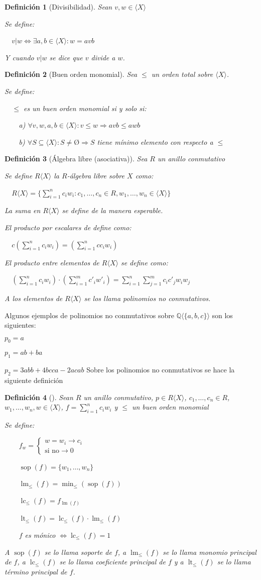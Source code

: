 \documentclass{amsbook}
\theoremstyle{customstyle}
\newtheorem{definition}{Definición}[section]
\newcommand{\definición}[2][]{
  \begin{definition}[#1]
  \setlength{\parindent}{2em} %
  #2
  \end{definition}
}
\DeclareMathOperator{\sop}{sop}
\DeclareMathOperator{\lm}{lm}
\DeclareMathOperator{\lc}{lc}
\DeclareMathOperator{\lt}{lt}
\begin{document}
\definición[Divisibilidad] {
Sean $v, w ∈ ⟨X⟩$

Se define:

  $v | w ⇔ ∃a , b ∈ ⟨X⟩ : w = avb$

Y cuando $v | w$ se dice que $v$ divide a $w$.
}

\definición[Buen orden monomial] {
Sea $≤$ un orden total sobre $⟨X⟩$.

Se define:

  $≤$ es un buen orden monomial si y solo si:

    a) $∀v, w, a, b ∈ ⟨X⟩ : v ≤ w ⇒ avb ≤ awb$

    b) $∀S ⊆ ⟨X⟩ : S ≠ Ø ⇒ S$ tiene mínimo elemento con respecto a $≤$
}

\definición[Álgebra libre (asociativa)] {
Sea $R$ un anillo conmutativo

Se define $R⟨X⟩$ la $R$-álgebra libre sobre $X$ como:

  $R⟨X⟩ = \{\sum_{i = 1}^n c_i w_i : c_1, …, c_n ∈ R, w_1, …, w_n ∈ ⟨X⟩\}$

La suma en $R⟨X⟩$ se define de la manera esperable.

El producto por escalares de define como:

  $c (\sum_{i = 1}^n c_i w_i) = (\sum_{i = 1}^n c c_i w_i)$

El producto entre elementos de $R⟨X⟩$ se define como:

  $(\sum_{i = 1}^n c_i w_i) · (\sum_{i = 1}^m c'_i w'_i) = \sum_{i = 1}^n \sum_{j = 1}^m c_i c'_j w_i w_j$

A los elementos de $R⟨X⟩$ se los llama polinomios no conmutativos.
}

Algunos ejemplos de polinomios no conmutativos sobre $ℚ⟨\{a, b, c\}⟩$ son los siguientes:

$p_0 = a$

$p_1 = ab + ba$

$p_2 = 3 abb + 4 bcca - 2 acab$
Sobre los polinomios no conmutativos se hace la siguiente definición


\definición[] {
Sean $R$ un anillo conmutativo, $p ∈ R⟨X⟩$, $c_1, …, c_n ∈ R$, $w_1, …, w_n, w ∈ ⟨X⟩$, $f = \sum_{i = 1}^n c_i w_i$ y $≤$ un buen orden monomial

Se define:

    $f_w = \left\{\begin{array}{ll} w = w_i → c_i \\ \text{si no} → 0  \end{array} \right. $

    $\sop(f) = \{w_1, …, w_n\}$

    $\lm_≤(f) = \min_≤(\sop(f))$

    $\lc_≤(f) = f_{\lm(f)}$

    $\lt_≤(f) = \lc_≤(f) · \lm_≤(f)$

    $f$ es mónico $⇔ \lc_≤(f) = 1$

A $\sop(f)$ se lo llama soporte de $f$, a $\lm_≤(f)$ se lo llama monomio principal de $f$, a $\lc_≤(f)$ se lo llama coeficiente principal de $f$ y a $\lt_≤(f)$ se lo llama término principal de $f$.

}
\end{document}
